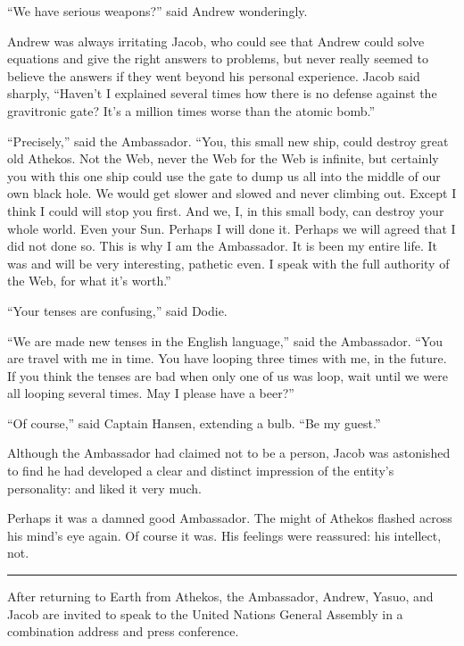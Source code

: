 \documentclass[english,11pt,letterpaper,onecolumn]{scrbook}
\begin{document}
	``We have serious weapons?'' said Andrew wonderingly.

	Andrew was always irritating Jacob, who could see that Andrew could solve equations and give the right answers to problems, but never really seemed to believe the answers if they went beyond his personal experience.  Jacob said sharply, ``Haven't I explained several times how there is no defense against the gravitronic gate?  It's a million times worse than the atomic bomb.''

	``Precisely,'' said the Ambassador.  ``You, this small new ship, could destroy great old Athekos.  Not the Web, never the Web for the Web is infinite, but certainly you with this one ship could use the gate to dump us all into the middle of our own black hole.  We would get slower and slowed and never climbing out.  Except I think I could will stop you first.  And we, I, in this small body, can destroy your whole world.  Even your Sun.  Perhaps I will done it.  Perhaps we will agreed that I did not done so.  This is why I am the Ambassador.  It is been my entire life.  It was and will be very interesting, pathetic even.  I speak with the full authority of the Web, for what it's worth.''

	``Your tenses are confusing,'' said Dodie.

	``We are made new tenses in the English language,'' said the Ambassador.  ``You are travel with me in time.  You have looping three times with me, in the future.  If you think the tenses are bad when only one of us was loop, wait until we were all looping several times.  May I please have a beer?''

	``Of course,'' said Captain Hansen, extending a bulb.  ``Be my guest.''

	Although the Ambassador had claimed not to be a person, Jacob was astonished to find he had developed a clear and distinct impression of the entity's personality:  and liked it very much.

	Perhaps it was a damned good Ambassador.  The might of Athekos flashed across his mind's eye again.  Of course it was.  His feelings were reassured:  his intellect, not.
	
	\begin{center}\rule[3pt]{2in}{0.5pt}\end{center}

	After returning to Earth from Athekos, the Ambassador, Andrew, Yasuo, and Jacob are invited to speak to the United Nations General Assembly in a combination address and press conference.
	
\end{document}
